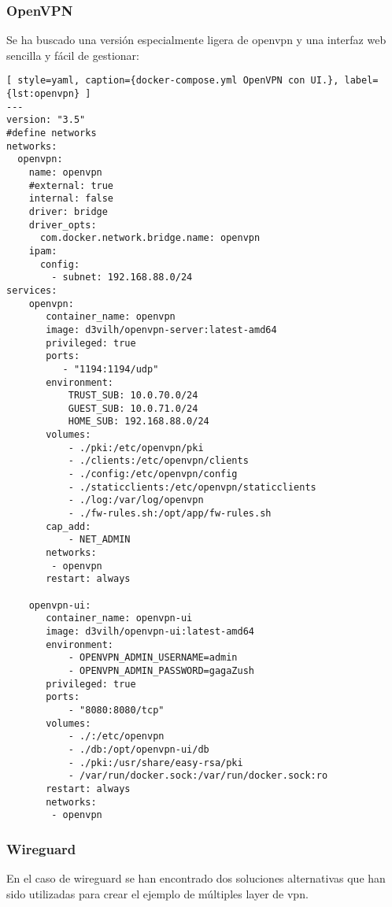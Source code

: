 \subsubsection{OpenVPN}
Se ha buscado una versión especialmente ligera de openvpn y una interfaz web sencilla y fácil de gestionar:
\begin{lstlisting}[ style=yaml, caption={docker-compose.yml OpenVPN con UI.}, label={lst:openvpn} ]
---
version: "3.5"
#define networks
networks:
  openvpn:
    name: openvpn
    #external: true
    internal: false
    driver: bridge
    driver_opts:
      com.docker.network.bridge.name: openvpn
    ipam:
      config:
        - subnet: 192.168.88.0/24
services:
    openvpn:
       container_name: openvpn
       image: d3vilh/openvpn-server:latest-amd64
       privileged: true
       ports: 
          - "1194:1194/udp"
       environment:
           TRUST_SUB: 10.0.70.0/24
           GUEST_SUB: 10.0.71.0/24
           HOME_SUB: 192.168.88.0/24
       volumes:
           - ./pki:/etc/openvpn/pki
           - ./clients:/etc/openvpn/clients
           - ./config:/etc/openvpn/config
           - ./staticclients:/etc/openvpn/staticclients
           - ./log:/var/log/openvpn
           - ./fw-rules.sh:/opt/app/fw-rules.sh
       cap_add:
           - NET_ADMIN
       networks:
        - openvpn
       restart: always

    openvpn-ui:
       container_name: openvpn-ui
       image: d3vilh/openvpn-ui:latest-amd64
       environment:
           - OPENVPN_ADMIN_USERNAME=admin
           - OPENVPN_ADMIN_PASSWORD=gagaZush
       privileged: true
       ports:
           - "8080:8080/tcp"
       volumes:
           - ./:/etc/openvpn
           - ./db:/opt/openvpn-ui/db
           - ./pki:/usr/share/easy-rsa/pki
           - /var/run/docker.sock:/var/run/docker.sock:ro
       restart: always
       networks:
        - openvpn
\end{lstlisting}

\subsubsection{Wireguard}
En el caso de wireguard se han encontrado dos soluciones alternativas que han sido utilizadas para crear el ejemplo de múltiples layer de vpn.

